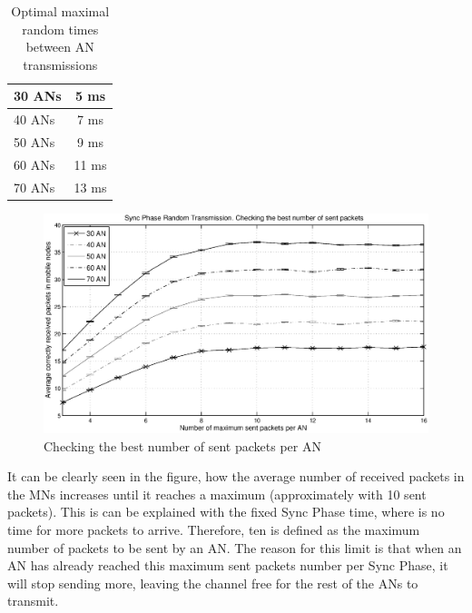 \begin{table}
 \begin{center}
  \begin{tabular}{|l|c|}
   \hline
   30 \acp{AN} & 5 ms \\
   \hline
   40 \acp{AN} & 7 ms \\
   \hline
   50 \acp{AN} & 9 ms \\
   \hline
   60 \acp{AN} & 11 ms \\
   \hline
   70 \acp{AN} & 13 ms \\
   \hline
  \end{tabular}
  \caption{Optimal maximal random times between \ac{AN} transmissions}
  \label{tab:optimalTransmitTimes}
 \end{center}
\end{table}

\begin{figure}[ht]
 \begin{center}
  \includegraphics[width=1\textwidth]{randomTimeCheckingTheBestNumberOfSentPacketsForAnchor.eps}
 \end{center}
 \caption{Checking the best number of sent packets per \ac{AN}}
 \label{fig:randomTimeCheckingTheBestNumberOfSentPacketsForAnchor}
\end{figure}

It can be clearly seen in the figure, how the average number of received packets in the \acp{MN} increases until it reaches a maximum (approximately
with 10 sent packets). This is can be explained with the fixed Sync Phase time, where is no time for more packets to arrive. Therefore, ten is defined 
as the maximum number of packets to be sent by an \ac{AN}. The reason for this limit is that when an \ac{AN} has already reached this maximum sent packets 
number per Sync Phase, it will stop sending more, leaving the channel free for the rest of the \acp{AN} to transmit.

